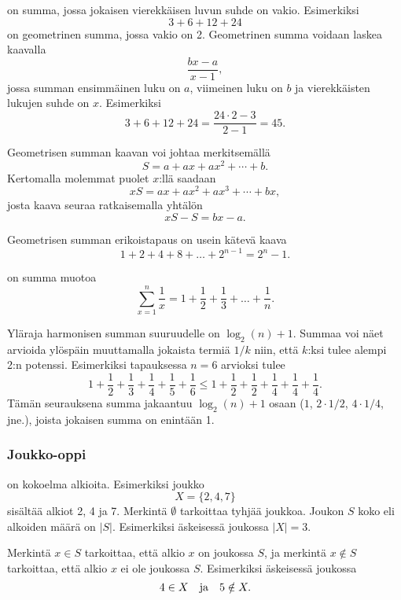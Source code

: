  on summa,
jossa jokaisen vierekkäisen luvun suhde on vakio.
Esimerkiksi
\[3+6+12+24\]
on geometrinen summa,
jossa vakio on 2.
Geometrinen summa voidaan laskea kaavalla
\[\frac{bx-a}{x-1},\]
jossa summan ensimmäinen luku on $a$,
viimeinen luku on $b$ ja vierekkäisten lukujen suhde on $x$.
Esimerkiksi
\[3+6+12+24=\frac{24 \cdot 2 - 3}{2-1} = 45.\]

Geometrisen summan kaavan voi johtaa merkitsemällä
\[ S = a + ax + ax^2 + \cdots + b .\] 
Kertomalla molemmat puolet $x$:llä saadaan
\[ xS = ax + ax^2 + ax^3 + \cdots + bx,\]
josta kaava seuraa ratkaisemalla yhtälön
\[ xS-S = bx-a.\]

Geometrisen summan erikoistapaus on usein kätevä kaava
\[1+2+4+8+\ldots+2^{n-1}=2^n-1.\]



 on summa muotoa
\[ \sum_{x=1}^n \frac{1}{x} = 1+\frac{1}{2}+\frac{1}{3}+\ldots+\frac{1}{n}.\]

Yläraja harmonisen summan suuruudelle on $\log_2(n)+1$.
Summaa voi näet arvioida ylöspäin
muuttamalla jokaista termiä $1/k$ niin,
että $k$:ksi tulee alempi 2:n potenssi.
Esimerkiksi tapauksessa $n=6$ arvioksi tulee
\[ 1+\frac{1}{2}+\frac{1}{3}+\frac{1}{4}+\frac{1}{5}+\frac{1}{6} \le
1+\frac{1}{2}+\frac{1}{2}+\frac{1}{4}+\frac{1}{4}+\frac{1}{4}.\]
Tämän seurauksena summa jakaantuu $\log_2(n)+1$ osaan
($1$, $2 \cdot 1/2$, $4 \cdot 1/4$, jne.),
joista jokaisen summa on enintään 1.

\subsubsection{Joukko-oppi}


 on kokoelma alkioita.
Esimerkiksi joukko
\[X=\{2,4,7\}\]
sisältää alkiot 2, 4 ja 7.
Merkintä $\emptyset$ tarkoittaa tyhjää joukkoa.
Joukon $S$ koko eli alkoiden määrä on $|S|$.
Esimerkiksi äskeisessä joukossa $|X|=3$.

Merkintä $x \in S$ tarkoittaa,
että alkio $x$ on joukossa $S$,
ja merkintä $x \notin S$ tarkoittaa,
että alkio $x$ ei ole joukossa $S$.
Esimerkiksi äskeisessä joukossa
\[4 \in X \hspace{10px}\textrm{ja}\hspace{10px} 5 \notin X.\]


